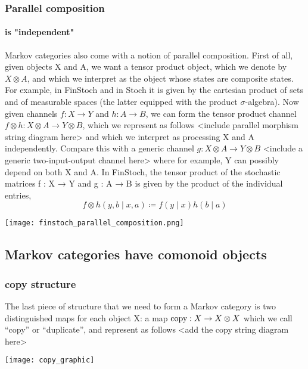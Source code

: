 \begin{frame}
    \frametitle{Parallel composition} 
    \framesubtitle{is "independent"}
Markov categories also come with a notion of parallel composition. First of all, given objects X and A, we want a tensor product object, which we denote by $X\otimes A$, and which we interpret as the object whose states are composite states. For example, in FinStoch and in Stoch it is given by the cartesian product of sets and of measurable spaces (the latter equipped with the product $\sigma$-algebra). Now given channels $f: X\to Y$ and $h: A\to B$, we can form the tensor product channel $f\otimes h: X\otimes A\to Y\otimes B$, which we represent as follows
<include parallel morphism string diagram here>
and which we interpret as processing X and A independently. Compare this with a generic channel $g: X\otimes A\to Y\otimes B$
<include a generic two-input-output channel here>
where for example, Y can possibly depend on both X and A. In FinStoch, the tensor product of the stochastic matrices f : X → Y and g : A → B is given by the product of the individual entries,
\[
    f\otimes h(y, b\mid x, a)\coloneqq f(y\mid x)h(b\mid a)
\]
\end{frame}

\begin{frame}
    \begin{center}
        \texttt{[image: finstoch\_parallel\_composition.png]}
    \end{center}
\end{frame}

\subsection{Markov categories have comonoid objects}
\begin{frame}
    \frametitle{copy structure}
    \begin{minipage}{.55\textwidth}
        The last piece of structure that we need to form a Markov category is two distinguished maps for each object X: a map $\text{\normalfont copy}: X\to X\otimes X$ which we call “copy” or “duplicate”, and represent as follows
        <add the copy string diagram here>
    \end{minipage}
    \hfill
    \begin{minipage}{.4\textwidth}
        \texttt{[image: copy\_graphic]}
    \end{minipage}
\end{frame}


